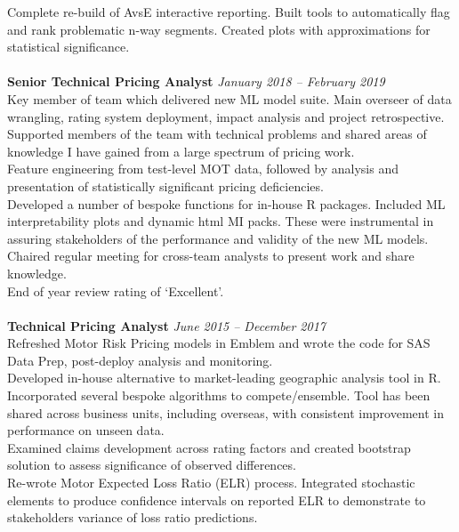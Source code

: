 \documentclass[11pt]{article}
\begin{document}
\begin{description}
\textbullet \quad Complete re-build of AvsE interactive reporting. Built tools to automatically flag and rank problematic n-way segments. Created plots with approximations for statistical significance.
\\\\
\textbf{Senior Technical Pricing Analyst} \emph{January 2018 -- February 2019}\\
\textbullet \quad Key member of team which delivered new ML model suite. Main overseer of data wrangling, rating system deployment, impact analysis and project retrospective. \\
\textbullet \quad Supported members of the team with technical problems and shared areas of knowledge I have gained from a large spectrum of pricing work. \\
\textbullet \quad Feature engineering from test-level MOT data, followed by analysis and presentation of statistically significant pricing deficiencies. \\
\textbullet \quad Developed a number of bespoke functions for in-house R packages. Included ML interpretability plots and dynamic html MI packs. These were instrumental in assuring stakeholders of the performance and validity of the new ML models. \\
\textbullet \quad Chaired regular meeting for cross-team analysts to present work and share knowledge. \\
\textbullet \quad End of year review rating of `Excellent'.
\\\\
\textbf{Technical Pricing Analyst} \emph{June 2015 -- December 2017}\\
\textbullet \quad Refreshed Motor Risk Pricing models in Emblem and wrote the code for SAS Data Prep, post-deploy analysis and monitoring. \\
\textbullet \quad Developed in-house alternative to market-leading geographic analysis tool in R. Incorporated several bespoke algorithms to compete/ensemble. Tool has been shared across business units, including overseas, with consistent improvement in performance on unseen data. \\
\textbullet \quad Examined claims development across rating factors and created bootstrap solution to assess significance of observed differences. \\
\textbullet \quad Re-wrote Motor Expected Loss Ratio (ELR) process. Integrated stochastic elements to produce confidence intervals on reported ELR to demonstrate to stakeholders variance of loss ratio predictions.\\

\end{description}
\end{document}

